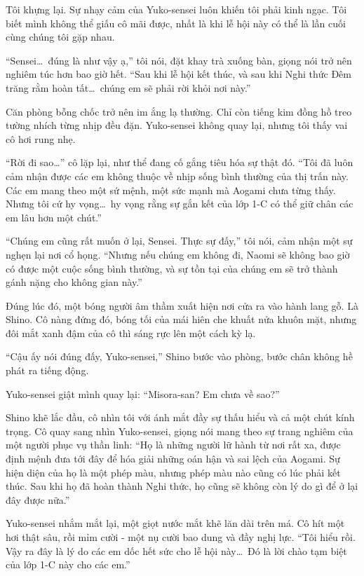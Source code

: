 \documentclass[../main.tex]{subfiles}
\begin{document}
Tôi khựng lại. Sự nhạy cảm của Yuko-sensei luôn khiến tôi phải kinh ngạc. Tôi biết mình không thể giấu cô mãi được, nhất là khi lễ hội này có thể là lần cuối cùng chúng tôi gặp nhau.

``Sensei\dots\ đúng là như vậy ạ,'' tôi nói, đặt khay trà xuống bàn, giọng nói trở nên nghiêm túc hơn bao giờ hết. ``Sau khi lễ hội kết thúc, và sau khi Nghi thức Đêm trăng rằm hoàn tất\dots\ chúng em sẽ phải rời khỏi nơi này.''

Căn phòng bỗng chốc trở nên im ắng lạ thường. Chỉ còn tiếng kim đồng hồ treo tường nhích từng nhịp đều đặn. Yuko-sensei không quay lại, nhưng tôi thấy vai cô hơi rung nhẹ.

``Rời đi sao\dots'' cô lặp lại, như thể đang cố gắng tiêu hóa sự thật đó. ``Tôi đã luôn cảm nhận được các em không thuộc về nhịp sống bình thường của thị trấn này. Các em mang theo một sứ mệnh, một sức mạnh mà Aogami chưa từng thấy. Nhưng tôi cứ hy vọng\dots\ hy vọng rằng sự gắn kết của lớp 1-C có thể giữ chân các em lâu hơn một chút.''

``Chúng em cũng rất muốn ở lại, Sensei. Thực sự đấy,'' tôi nói, cảm nhận một sự nghẹn lại nơi cổ họng. ``Nhưng nếu chúng em không đi, Naomi sẽ không bao giờ có được một cuộc sống bình thường, và sự tồn tại của chúng em sẽ trở thành gánh nặng cho không gian này.''

Đúng lúc đó, một bóng người âm thầm xuất hiện nơi cửa ra vào hành lang gỗ. Là Shino. Cô nàng đứng đó, bóng tối của mái hiên che khuất nửa khuôn mặt, nhưng đôi mắt xanh đậm của cô thì sáng rực lên một cách kỳ lạ.

``Cậu ấy nói đúng đấy, Yuko-sensei,'' Shino bước vào phòng, bước chân không hề phát ra tiếng động.

Yuko-sensei giật mình quay lại: ``Misora-san? Em chưa về sao?''

Shino khẽ lắc đầu, cô nhìn tôi với ánh mắt đầy sự thấu hiểu và cả một chút kính trọng. Cô quay sang nhìn Yuko-sensei, giọng nói mang theo sự trang nghiêm của một người phục vụ thần linh: ``Họ là những người lữ hành từ nơi rất xa, được định mệnh đưa tới đây để hóa giải những oán hận và sai lệch của Aogami. Sự hiện diện của họ là một phép màu, nhưng phép màu nào cũng có lúc phải kết thúc. Sau khi họ đã hoàn thành Nghi thức, họ cũng sẽ không còn lý do gì để ở lại đây được nữa.''

Yuko-sensei nhắm mắt lại, một giọt nước mắt khẽ lăn dài trên má. Cô hít một hơi thật sâu, rồi mỉm cười - một nụ cười bao dung và đầy nghị lực. ``Tôi hiểu rồi. Vậy ra đây là lý do các em dốc hết sức cho lễ hội này\dots\ Đó là lời chào tạm biệt của lớp 1-C này cho các em.''
\end{document}
